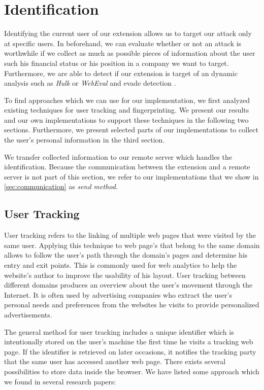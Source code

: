 \newpage	
\section{Identification}
\label{sec:identification}

	Identifying the current user of our extension allows us to target our attack only at specific users. In beforehand, we can evaluate whether or not an attack is worthwhile if we collect as much as possible pieces of information about the user such his financial status or his position in a company we want to target. Furthermore, we are able to detect if our extension is target of an dynamic analysis such as \textit{Hulk} or \textit{WebEval} and evade detection \cite{184485,190984}.
	
	To find approaches which we can use for our implementation, we first analyzed existing techniques for user tracking and fingerprinting. We present our results and our own implementations to support these techniques in the following two sections. Furthermore, we present selected parts of our implementations to collect the user's personal information in the third section.
	
	We transfer collected information to our remote server which handles the identification. Because the communication between the extension and a remote server is not part of this section, we refer to our implementations that we show in \autoref{sec:communication} as \textit{send method}.
	
\subsection{User Tracking}

	User tracking refers to the linking of multiple web pages that were visited by the same user. Applying this technique to web page's that belong to the same domain allows to follow the user's path through the domain's pages and determine his entry and exit points. This is commonly used for web analytics to help the website's author to improve the usability of his layout. User tracking between different domains produces an overview about the user's movement through the Internet. It is often used by advertising companies who extract the user's personal needs and preferences from the websites he visits to provide personalized advertisements.
		
	The general method for user tracking includes a unique identifier which is intentionally stored on the user's machine the first time he visits a tracking web page. If the identifier is retrieved on later occasions, it notifies the tracking party that the same user has accessed another web page. There exists several possibilities to store data inside the browser. We have listed some approach which we found in several research papers:
	
